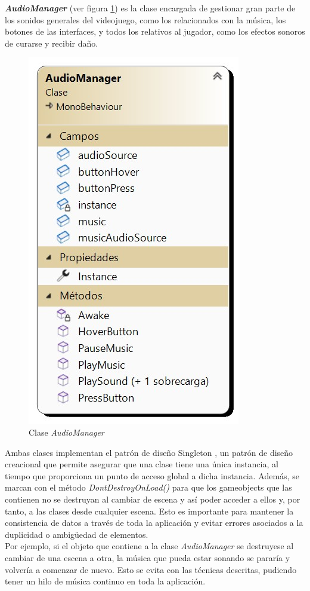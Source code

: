 \textbf{\textit{AudioManager}} (ver figura \ref{fig:AudioManager}) es la clase encargada de gestionar gran parte de los sonidos generales del videojuego, como los relacionados con la música, los botones de las interfaces, y todos los relativos al jugador, como los efectos sonoros de curarse y recibir daño.
\begin{figure}[h]
	\centering
	\includegraphics[scale=0.45]{img/AudioManager.jpg}
	\caption{Clase \textit{AudioManager}}
	\label{fig:AudioManager}
    \end{figure}
Ambas clases implementan el patrón de diseño Singleton \cite{wiki:Singleton}, un patrón de diseño creacional que permite asegurar que una clase tiene una única instancia, al tiempo que proporciona un punto de acceso global a dicha instancia. Además, se marcan con el método \textit{DontDestroyOnLoad()} \cite{doc:DontDestroyOnLoad} para que los gameobjects que las contienen no se destruyan al cambiar de escena y así poder acceder a ellos y, por tanto, a las clases desde cualquier escena. Esto es importante para mantener la consistencia de datos a través de toda la aplicación y evitar errores asociados a la duplicidad o ambigüedad de elementos.\\
Por ejemplo, si el objeto que contiene a la clase \textit{AudioManager} se destruyese al cambiar de una escena a otra, la música que pueda estar sonando se pararía y volvería a comenzar de nuevo. Esto se evita con las técnicas descritas, pudiendo tener un hilo de música continuo en toda la aplicación.

